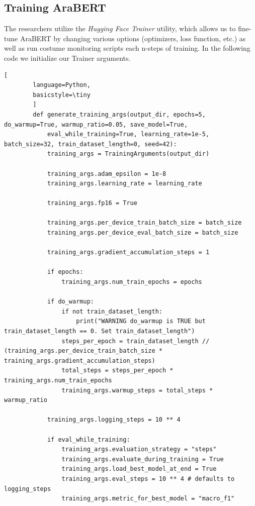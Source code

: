 \documentclass[12pt]{diazessay}
\begin{document}
    \subsection{Training AraBERT}
    The researchers utilize the \emph{Hugging Face Trainer} utility, which allows us to fine-tune AraBERT by changing various options (optimizers, loss function, etc.) as well as run costume monitoring scripts each n-steps of training.
    In the following code we initialize our Trainer arguments.
    \begin{lstlisting}[
        language=Python,
        basicstyle=\tiny
        ]
        def generate_training_args(output_dir, epochs=5, do_warmup=True, warmup_ratio=0.05, save_model=True, 
            eval_while_training=True, learning_rate=1e-5, batch_size=32, train_dataset_length=0, seed=42):
            training_args = TrainingArguments(output_dir)
        
            training_args.adam_epsilon = 1e-8
            training_args.learning_rate = learning_rate
        
            training_args.fp16 = True
        
            training_args.per_device_train_batch_size = batch_size
            training_args.per_device_eval_batch_size = batch_size
        
            training_args.gradient_accumulation_steps = 1
            
            if epochs:
                training_args.num_train_epochs = epochs
        
            if do_warmup:
                if not train_dataset_length:
                    print("WARNING do_warmup is TRUE but train_dataset_length == 0. Set train_dataset_length")
                steps_per_epoch = train_dataset_length // (training_args.per_device_train_batch_size * training_args.gradient_accumulation_steps)
                total_steps = steps_per_epoch * training_args.num_train_epochs
                training_args.warmup_steps = total_steps * warmup_ratio 
            
            training_args.logging_steps = 10 ** 4
            
            if eval_while_training:
                training_args.evaluation_strategy = "steps"
                training_args.evaluate_during_training = True
                training_args.load_best_model_at_end = True
                training_args.eval_steps = 10 ** 4 # defaults to logging_steps
                training_args.metric_for_best_model = "macro_f1"
            

\end{lstlisting}
\end{document}
